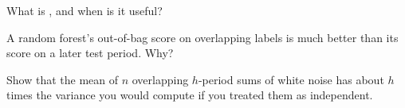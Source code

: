 \begin{interviewq}\label{iq:ml:targets-labels-and-sample-weights:4}
What is , and when is it useful?
\end{interviewq}

\begin{interviewq}\label{iq:ml:targets-labels-and-sample-weights:5}
A random forest's out-of-bag score on overlapping labels is much better than its score on a later test period. Why?
\end{interviewq}

\begin{interviewq}\label{iq:ml:targets-labels-and-sample-weights:6}
Show that the mean of $n$ overlapping $h$-period sums of white noise has about $h$ times the variance you would compute
if you treated them as independent.
\end{interviewq}
